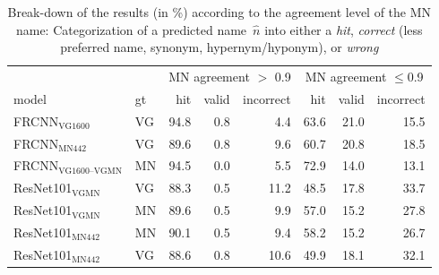 \begin{table}[t]
\centering
	\small
\begin{tabular}{ll|rrr|rrr}
\toprule
&  & \multicolumn{3}{c|}{MN agreement $>$ 0.9} & \multicolumn{3}{c}{MN agreement $\leq$0.9}\\
                         model &  gt &  hit &  valid &  incorrect &  hit &  valid &  incorrect \\
\midrule
       FRCNN$_{\text{VG1600}}$ &  VG &   94.8 &      0.8 &      4.4 &   63.6 &     21.0 &     15.5 \\
        FRCNN$_{\text{MN442}}$ &  VG &   89.6 &      0.8 &      9.6 &   60.7 &     20.8 &     18.5 \\
                \midrule
 FRCNN$_{\text{VG1600--VGMN}}$ &  MN &   94.5 &      0.0 &      5.5 &   72.9 &     14.0 &     13.1 \\
         \midrule
     ResNet101$_{\text{VGMN}}$ &  VG &   88.3 &      0.5 &     11.2 &   48.5 &     17.8 &     33.7 \\
     ResNet101$_{\text{VGMN}}$ &  MN &   89.6 &      0.5 &      9.9 &   57.0 &     15.2 &     27.8 \\
    ResNet101$_{\text{MN442}}$ &  MN &   90.1 &      0.5 &      9.4 &   58.2 &     15.2 &     26.7 \\
    ResNet101$_{\text{MN442}}$ &  VG &   88.6 &      0.8 &     10.6 &   49.9 &     18.1 &     32.1 \\
\bottomrule
\end{tabular}
\caption{Break-down of the results (in \%) according to the agreement level of the MN name: Categorization of a predicted name\ $\hat{n}$ into either a \textit{hit}, \textit{correct} (less preferred name, synonym, hypernym/hyponym), or \textit{wrong} \label{tab:exp_errors_agreement}}
\end{table}

